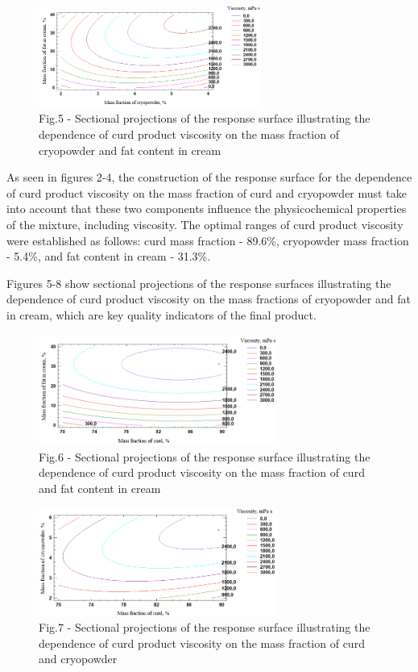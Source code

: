 \begin{figure}[H]
	\centering
	\includegraphics[width=0.65\textwidth]{media/pish2/image85}
	\caption*{Fig.5 - Sectional projections of the response surface illustrating the dependence of curd product viscosity on the mass fraction of cryopowder and fat content in cream}
\end{figure}

\begin{multicols}{2}
As seen in figures 2-4, the construction of the response surface for the
dependence of curd product viscosity on the mass fraction of curd and
cryopowder must take into account that these two components influence
the physicochemical properties of the mixture, including viscosity. The
optimal ranges of curd product viscosity were established as follows:
curd mass fraction - 89.6\%, cryopowder mass fraction - 5.4\%, and fat
content in cream - 31.3\%.

Figures 5-8 show sectional projections of the response surfaces
illustrating the dependence of curd product viscosity on the mass
fractions of cryopowder and fat in cream, which are key quality
indicators of the final product.
\end{multicols}

\begin{figure}[H]
	\centering
	\includegraphics[width=0.7\textwidth]{media/pish2/image86}
	\caption*{Fig.6 - Sectional projections of the response surface illustrating the dependence of curd product viscosity on the mass fraction of curd and fat content in cream}
\end{figure}

\begin{figure}[H]
	\centering
	\includegraphics[width=0.7\textwidth]{media/pish2/image87}
	\caption*{Fig.7 - Sectional projections of the response surface
illustrating the dependence of curd product viscosity on the mass
fraction of curd and cryopowder}
\end{figure}


